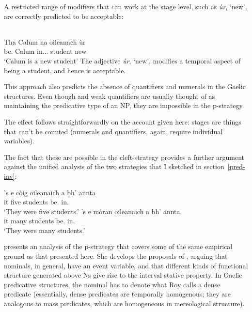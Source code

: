 \documentclass[output=paper]{langsci/langscibook}
\begin{document}
A restricted range of modifiers that can work at the stage level, such as
\emph{\`ur}, `new', are correctly predicted to be acceptable:

\ea {}\\
\gll Tha Calum na oileanach \`ur\\
be.\Prs{} Calum in.\Poss.\Tsg.\M{} student new\\
\glt \enquote*{Calum is a new student}
\z
The adjective \emph{\`ur}, `new', modifies a temporal aspect of being a
student, and hence is acceptable.

This approach also predicts the absence of quantifiers and
numerals in the Gaelic structures.  Even though  and weak quantifiers are usually\linebreak
thought of as maintaining the predicative type of an NP, they are impossible in the
p-strategy.

\ea {}
\z \z
The effect follows straightforwardly on the account given here: stages are things that can't be counted (numerals and quantifiers,
again, require individual variables).

The fact that these  are possible in the cleft-strategy provides a further argument against the unified analysis of the two strategies that I sketched in section~\eqref{pred-inv}:

\ea {}
\ea \gll   's e c\`oig oileanaich a bh' annta\\
\Cop{} it five students \Rel{} be.\Prs{} in.\Tpl{}\\
\glt \enquote*{They were five students.}
\ex \gll  's e m\`oran oileanaich a bh' annta\\
\Cop{} it many students \Rel{} be.\Prs{} in.\Tpl{}\\
\glt \enquote*{They were many students.}
\z \z

\textcite{schreiner:15} presents an analysis of the p-strategy that covers
some of the same empirical ground as that presented here. She develops the
proposals of \textcite{roy:06}, arguing that nominals, in general, have an
event variable, and that different kinds of functional structure generated
above Ns give rise to the interval stative property. In Gaelic predicative
structures, the nominal has to denote what Roy calls a dense predicate
(essentially, dense predicates are temporally homogenous; they are analogous to
mass predicates, which are homogeneous in mereological structure).
\end{document}
